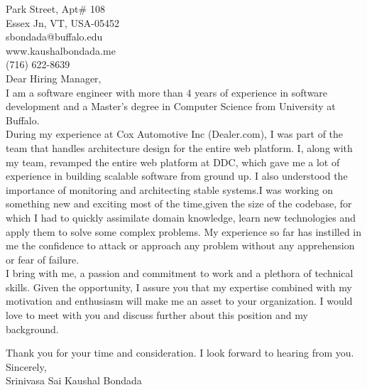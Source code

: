 \documentclass[10pt,letterpaper,oneside]{article}
\begin{document}
 Park Street, Apt\# 108\\
Essex Jn, VT, USA-05452\\
sbondada@buffalo.edu\\
www.kaushalbondada.me\\
(716) 622-8639\\
 
\noindent Dear Hiring Manager,\\
 
I am a software engineer with more than 4 years of experience in software development and a Master's degree in Computer Science from University at Buffalo.\\

During my experience at Cox Automotive Inc (Dealer.com), I was part of the team that handles architecture design for the entire web platform. I, along with my team, revamped the entire web platform at DDC, which gave me a lot of experience in building scalable software from ground up. I also understood the importance of monitoring and architecting stable systems.I was working on something new and exciting most of the time,given the size of the codebase, for which I had to quickly assimilate domain knowledge, learn new technologies and apply them to solve some complex problems. My  experience so far has instilled in me the confidence to attack or approach any problem without any apprehension or fear of failure.\\
 
I bring with me, a passion and commitment to work and a plethora of technical skills. Given the opportunity, I assure you that my expertise combined with my motivation and enthusiasm will make me an asset to your organization. I would love to meet with you and discuss further about this position and my background.

Thank you for your time and consideration. I look forward to hearing from you.\\
 
\noindent Sincerely,\\
Srinivasa Sai Kaushal Bondada\\
\end{document}
